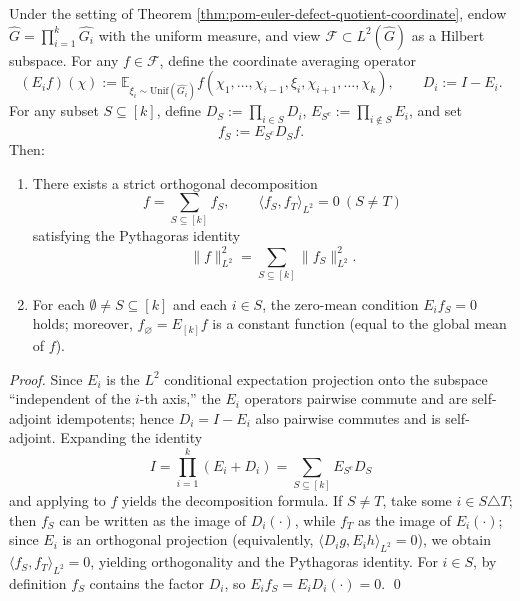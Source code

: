 \begin{theorem}\label{thm:pom-euler-defect-orthogonal-pythagoras}
Under the setting of Theorem \ref{thm:pom-euler-defect-quotient-coordinate}, endow \(\widehat G=\prod_{i=1}^k\widehat{G_i}\) with the uniform measure, and view \(\mathcal F\subset L^2(\widehat G)\) as a Hilbert subspace.
For any \(f\in\mathcal F\), define the coordinate averaging operator
\[
(E_i f)(\chi):=\mathbb{E}_{\xi_i\sim \mathrm{Unif}(\widehat{G_i})} f(\chi_1,\dots,\chi_{i-1},\xi_i,\chi_{i+1},\dots,\chi_k),
\qquad
D_i:=I-E_i.
\]
For any subset \(S\subseteq[k]\), define
\(
D_S:=\prod_{i\in S}D_i
\),
\(
E_{S^c}:=\prod_{i\notin S}E_i
\), and set
\[
f_S:=E_{S^c}D_S f.
\]
Then:
\begin{enumerate}
  \item There exists a strict orthogonal decomposition
  \[
  \boxed{\;
  f=\sum_{S\subseteq[k]} f_S,\qquad
  \langle f_S,f_T\rangle_{L^2}=0\ (S\ne T)\;}
  \]
  satisfying the Pythagoras identity
  \[
  \|f\|_{L^2}^2=\sum_{S\subseteq[k]}\|f_S\|_{L^2}^2.
  \]
  \item For each \(\emptyset\ne S\subseteq[k]\) and each \(i\in S\), the zero-mean condition \(E_i f_S=0\) holds; moreover, \(f_{\varnothing}=E_{[k]}f\) is a constant function (equal to the global mean of \(f\)).
\end{enumerate}
\end{theorem}
\begin{proof}
Since \(E_i\) is the \(L^2\) conditional expectation projection onto the subspace ``independent of the \(i\)-th axis,'' the \(E_i\) operators pairwise commute and are self-adjoint idempotents; hence \(D_i=I-E_i\) also pairwise commutes and is self-adjoint.
Expanding the identity
\[
I=\prod_{i=1}^k(E_i+D_i)=\sum_{S\subseteq[k]}E_{S^c}D_S
\]
and applying to \(f\) yields the decomposition formula.
If \(S\ne T\), take some \(i\in S\triangle T\); then \(f_S\) can be written as the image of \(D_i(\cdot)\), while \(f_T\) as the image of \(E_i(\cdot)\); since \(E_i\) is an orthogonal projection (equivalently, \(\langle D_i g, E_i h\rangle_{L^2}=0\)), we obtain \(\langle f_S,f_T\rangle_{L^2}=0\), yielding orthogonality and the Pythagoras identity.
For \(i\in S\), by definition \(f_S\) contains the factor \(D_i\), so \(E_i f_S=E_iD_i(\cdot)=0\). \qed
\end{proof}

